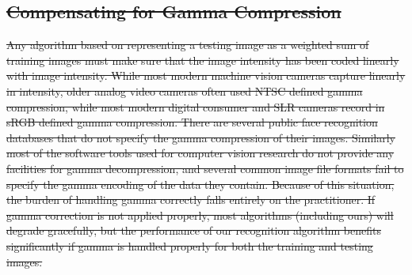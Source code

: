 \documentclass[12pt,journal,draftcls,letterpaper,onecolumn]{IEEEtran}
\providecommand{\DIFdel}[1]{{\protect\color{red}\sout{#1}}}                      %
\providecommand{\DIFdelbegin}{} %
\begin{document}


\DIFdelbegin \subsection{\DIFdel{Compensating for Gamma Compression}} %
\addtocounter{subsection}{-1}%
\DIFdel{Any algorithm
based on representing a testing image as a weighted sum of
training images must make sure that the image intensity has
been coded linearly with image intensity. While most modern machine vision
cameras capture linearly in intensity, older analog video
cameras often used NTSC defined gamma compression, while most
modern digital consumer and SLR cameras record in sRGB defined
gamma compression.  There are several public face recognition
databases that do not specify the gamma compression of their
images. Similarly most of the software
tools used for computer vision research do not provide any facilities
for gamma decompression, and several common image file formats fail to specify the gamma encoding of
the data they contain.  Because of this situation, the burden of handling
gamma correctly falls entirely on the practitioner.  If gamma correction is not applied properly,
most algorithms (including ours)
will degrade gracefully, but the performance of our recognition algorithm
benefits significantly if gamma is handled properly for both
the training and testing images.
}%
\end{document}
